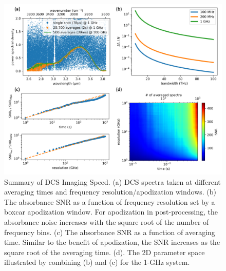 \documentclass{optica-article}
\begin{document}



\begin{figure}[H]
    \centering
    \includegraphics[width=\linewidth]{snr_analysis_v4.png}
    \caption{Summary of DCS Imaging Speed. (a) DCS spectra taken at different averaging times and frequency resolution/apodization windows. (b) The absorbance SNR as a function of frequency resolution set by a boxcar apodization window. For apodization in post-processing, the absorbance noise increases with the square root of the number of frequency bins. (c) The absorbance SNR as a function of averaging time. Similar to the benefit of apodization, the SNR increases as the square root of the averaging time. (d). The 2D parameter space illustrated by combining (b) and (c) for the 1-GHz system.}
    \label{fig:snr_analysis}
\end{figure}
\end{document}
